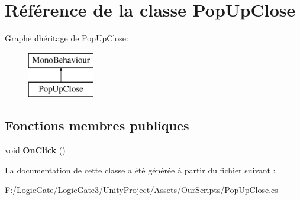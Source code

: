 \hypertarget{class_pop_up_close}{}\section{Référence de la classe Pop\+Up\+Close}
\label{class_pop_up_close}
Graphe d\textquotesingle{}héritage de Pop\+Up\+Close\+:\begin{figure}[H]
\begin{center}
\leavevmode
\includegraphics[height=2.000000cm]{class_pop_up_close}
\end{center}
\end{figure}
\subsection*{Fonctions membres publiques}
\begin{DoxyCompactItemize}
\item 
\mbox{\label{class_pop_up_close_a49e95ade990c0d89e175aa35c4f1213e}} 
void {\bfseries On\+Click} ()
\end{DoxyCompactItemize}


La documentation de cette classe a été générée à partir du fichier suivant \+:\begin{DoxyCompactItemize}
\item 
F\+:/\+Logic\+Gate/\+Logic\+Gate3/\+Unity\+Project/\+Assets/\+Our\+Scripts/Pop\+Up\+Close.\+cs\end{DoxyCompactItemize}
